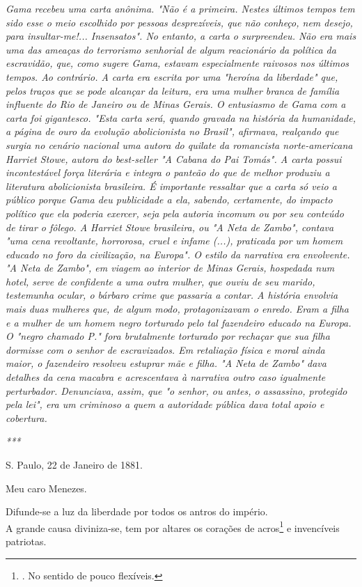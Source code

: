 \emph{Gama recebeu uma carta anônima. "Não é a primeira. Nestes últimos
tempos tem sido esse o meio escolhido por pessoas desprezíveis, que não
conheço, nem desejo, para insultar-me!... Insensatos". No entanto, a
carta o surpreendeu. Não era mais uma das ameaças do terrorismo
senhorial de algum reacionário da política da escravidão, que, como
sugere Gama, estavam especialmente raivosos nos últimos tempos. Ao
contrário. A carta era escrita por uma "heroína da liberdade" que, pelos
traços que se pode alcançar da leitura, era uma mulher branca de família
influente do Rio de Janeiro ou de Minas Gerais. O entusiasmo de Gama com
a carta foi gigantesco. "Esta carta será, quando gravada na história da
humanidade, a página de ouro da evolução abolicionista no Brasil",
afirmava, realçando que surgia no cenário nacional uma autora do quilate
da romancista norte-americana Harriet Stowe, autora do best-seller "A
Cabana do Pai Tomás". A carta possui incontestável força literária e
integra o panteão do que de melhor produziu a literatura abolicionista
brasileira. É importante ressaltar que a carta só veio a público porque
Gama deu publicidade a ela, sabendo, certamente, do impacto político que
ela poderia exercer, seja pela autoria incomum ou por seu conteúdo de
tirar o fôlego. A Harriet Stowe brasileira, ou "A Neta de Zambo",
contava "uma cena revoltante, horrorosa, cruel e infame (...), praticada
por um homem educado no foro da civilização, na Europa". O estilo da
narrativa era envolvente. "A Neta de Zambo", em viagem ao interior de
Minas Gerais, hospedada num hotel, serve de confidente a uma outra
mulher, que ouviu de seu marido, testemunha ocular, o bárbaro crime que
passaria a contar. A história envolvia mais duas mulheres que, de algum
modo, protagonizavam o enredo. Eram a filha e a mulher de um homem negro
torturado pelo tal fazendeiro educado na Europa. O "negro chamado P."
fora brutalmente torturado por rechaçar que sua filha dormisse com o
senhor de escravizados. Em retaliação física e moral ainda maior, o
fazendeiro resolveu estuprar mãe e filha. "A Neta de Zambo" dava
detalhes da cena macabra e acrescentava à narrativa outro caso
igualmente perturbador. Denunciava, assim, que "o senhor, ou antes, o
assassino, protegido pela lei", era um criminoso a quem a autoridade
pública dava total apoio e cobertura. }

\emph{***}

S. Paulo, 22 de Janeiro de 1881.

Meu caro Menezes.

Difunde-se a luz da liberdade por todos os antros do império.\\
A grande causa diviniza-se, tem por altares os corações de
acros\footnote{. No sentido de pouco flexíveis.} e invencíveis
patriotas.

